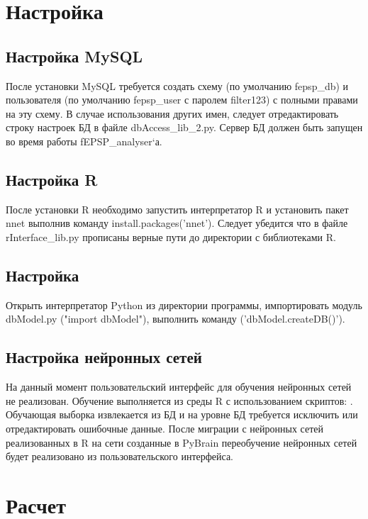 \documentclass[12pt,a4paper]{report}
\begin{document}
\chapter{Настройка}
\section{Настройка MySQL}
После установки MySQL требуется создать схему (по умолчанию fepsp\_db) и пользователя (по умолчанию fepsp\_user с паролем filter123) с полными правами на эту схему. В случае использования других имен, следует отредактировать строку настроек БД в файле dbAccess\_lib\_2.py.
Сервер БД должен быть запущен во время работы fEPSP\_analyser`а.
\section{Настройка R}
После установки R необходимо запустить интерпретатор R и установить пакет nnet выполнив команду install.packages('nnet'). Следует убедится что в файле rInterface\_lib.py прописаны верные пути до директории с библиотеками R.
\section{Настройка}
Открыть интерпретатор Python из директории программы, импортировать модуль dbModel.py ("import dbModel"), выполнить команду ('dbModel.createDB()'). 
\section{Настройка нейронных сетей}
На данный момент пользовательский интерфейс для обучения нейронных сетей не реализован. Обучение выполняется из среды R с использованием скриптов: . Обучающая выборка извлекается из БД и на уровне БД требуется исключить или отредактировать ошибочные данные. После миграции с нейронных сетей реализованных в R на сети созданные в PyBrain переобучение нейронных сетей будет реализовано из пользовательского интерфейса.
\chapter{Расчет}
\end{document}
